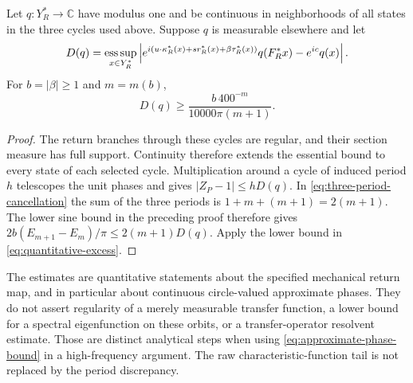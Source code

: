 \begin{corollary}
\label{cor:approximate-phase-bound}
Let $q:Y_R^*\to\mathbb C$ have modulus one and be continuous in
neighborhoods of all states in the three cycles used above. Suppose
$q$ is measurable elsewhere and let
\[
 D(q)=\mathop{\rm ess\,sup}_{x\in Y_R^*}
 \left|e^{i(u\cdot\kappa_R^*(x)+s r_R^*(x)+\beta\tau_R^*(x))}
                 q(F_R^*x)-e^{ic}q(x)\right|.
\]
For $b=|\beta|\ge1$ and $m=m(b)$,
\begin{equation}\label{eq:approximate-phase-bound}
 D(q)\ge\frac{b\,400^{-m}}{10000\pi(m+1)}.
\end{equation}
\end{corollary}
\begin{proof}
The return branches through these cycles are regular, and their
section measure has full support. Continuity therefore extends the
essential bound to every state of each selected cycle. Multiplication
around a cycle of induced period $h$ telescopes the unit phases and
gives $|Z_P-1|\le hD(q)$. In
\eqref{eq:three-period-cancellation} the sum of the three periods is
$1+m+(m+1)=2(m+1)$. The lower sine bound in the preceding proof
therefore gives
$2b(E_{m+1}-E_m)/\pi\le2(m+1)D(q)$. Apply the lower bound
in \eqref{eq:quantitative-excess}.
\end{proof}

The estimates are quantitative statements about the specified mechanical
return map, and in particular about continuous circle-valued approximate
phases. They do not assert regularity of a merely measurable transfer
function, a lower bound for a spectral eigenfunction on these orbits,
or a transfer-operator resolvent estimate. Those are distinct analytical
steps when using \eqref{eq:approximate-phase-bound} in a high-frequency
argument. The raw characteristic-function tail is not replaced by the
period discrepancy.
